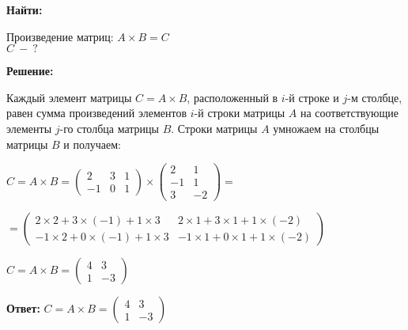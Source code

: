 \documentclass[12pt]{article}
\begin{document}
\textbf{Найти:}

Произведение матриц: $A \times B = C$\\
$C~-~?$

\textbf{Решение:}

Каждый элемент матрицы $C = A \times B$, расположенный в $i$-й строке и $j$-м
столбце, равен сумма произведений элементов $i$-й строки матрицы $A$ на
соответствующие элементы $j$-го столбца матрицы $B$. Строки матрицы $A$ умножаем
на столбцы матрицы $B$ и получаем:

$
  C = A \times B = \begin{pmatrix}
    2 & 3 & 1 \\
    -1 & 0 & 1
  \end{pmatrix} \times \begin{pmatrix}
    2 & 1 \\
    -1 & 1 \\
    3 & -2
  \end{pmatrix} =
$

$
  = \begin{pmatrix}
    2 \times 2 + 3 \times (-1) + 1 \times 3 & 2 \times 1 + 3 \times 1 + 1 \times (-2) \\
    -1 \times 2 + 0 \times (-1) + 1 \times 3 & -1 \times 1 + 0 \times 1 + 1 \times (-2)
  \end{pmatrix}
$

$
  C = A \times B = \begin{pmatrix}
    4 & 3 \\
    1 & -3
  \end{pmatrix}
$

\textbf{Ответ:}
$
  C = A \times B = \begin{pmatrix}
    4 & 3 \\
    1 & -3
  \end{pmatrix}
$
\end{document}
